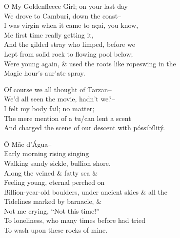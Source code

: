 O My Goldenfleece Girl; on your last day \\
We drove to Camburi, down the coast-- \\
I was virgin when it came to açai, you know, \\
Me first time really getting it, \\
And the gilded stray who limped, before we \\ 
Lept from solid rock to flowing pool below; \\
Were young again, \& used the roots like ropeswing in the \\
Magic hour's aur'ate spray.

Of course we all thought of Tarzan-- \\
We'd all seen the movie, hadn't we?-- \\
I felt my body fail; no matter; \\
The mere mention of a tu/can lent a scent \\
And charged the scene of our descent with póssibílitý.

Ô Mãe d'Água-- \\
Early morning rising singing \\
Walking sandy sickle, bullion shore, \\
Along the veined \& fatty sea \& \\
Feeling young, eternal perched on \\ 
Billion-year-old boulders, under ancient skies \& all the \\
Tidelines marked by barnacle, \& \\
Not me crying, ``Not this time!'' \\
To loneliness, who many times before had tried \\
To wash upon these rocks of mine.